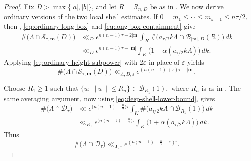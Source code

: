 \documentclass[reqno,11pt]{amsart}
\numberwithin{equation}{section}
\theoremstyle{definition}
\theoremstyle{remark}
\begin{document}
\begin{proof}
Fix $D>\max\{|a|,|b|\}$, and let $R=R_{n,D}$ be as in
. We now derive ordinary versions of
the two local shell estimates. If
$
0=m_1\le\cdots\le m_{n-1}\le n\tau/2,
$
then , \eqref{eq:ordinary-long-box} and \eqref{eq:long-box-containment} give
$$
\begin{aligned}
\#\bigl(\Lambda\cap\mathcal S_{\tau,\mathbf m}(D)\bigr)
&\ll_D
e^{n(n-1)\tau-2|\mathbf m|}
\int_K
\#\bigl(a_{\tau/2}k\Lambda
       \cap\mathcal B_{|\mathbf m|,D}(R)\bigr)\,dk\\
&\ll_D
e^{n(n-1)\tau-|\mathbf m|}
\int_K\bigl(1+\alpha(a_{\tau/2}k\Lambda)\bigr)\,dk.
\end{aligned}
$$
Applying \eqref{eq:ordinary-height-subpower} with $2\varepsilon$ in
place of $\varepsilon$ yields
\begin{equation}\label{eq:general-moderate-shell}
\#\bigl(\Lambda\cap\mathcal S_{\tau,\mathbf m}(D)\bigr)
\ll_{\Lambda,D,\varepsilon}
e^{(n(n-1)+\varepsilon)\tau-|\mathbf m|}.
\end{equation}

Choose $R_1\ge1$ such that
$
\{u:\|u\|\le R_n\}\subset\mathscr B_{R_1}(1),
$
where $R_n$ is as in . The same averaging
argument, now using \eqref{eq:deep-shell-lower-bound}, gives
$$
\begin{aligned}
\#\bigl(\Lambda\cap\mathcal D_\tau\bigr)
&\ll
e^{\bigl(n(n-1)-\frac n2\bigr)\tau}
\int_K\#\bigl(a_{\tau/2}k\Lambda
             \cap\mathscr B_{R_1}(1)\bigr)\,dk\\
&\ll_{R_1}
e^{\bigl(n(n-1)-\frac n2\bigr)\tau}
\int_K\bigl(1+\alpha(a_{\tau/2}k\Lambda)\bigr)\,dk.
\end{aligned}
$$
Thus
\begin{equation}\label{eq:general-deep-shell}
\#\bigl(\Lambda\cap\mathcal D_\tau\bigr)
\ll_{\Lambda,\varepsilon}
e^{(n(n-1)-\frac n2+\varepsilon)\tau}.
\end{equation}


\end{proof}
\end{document}
